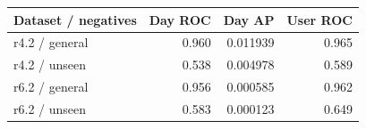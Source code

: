 \begin{tabular}{lrrr}
\toprule
Dataset / negatives & Day ROC & Day AP & User ROC \\
\midrule
r4.2 / general & 0.960 & 0.011939 & 0.965 \\
r4.2 / unseen & 0.538 & 0.004978 & 0.589 \\
r6.2 / general & 0.956 & 0.000585 & 0.962 \\
r6.2 / unseen & 0.583 & 0.000123 & 0.649 \\
\bottomrule
\end{tabular}
